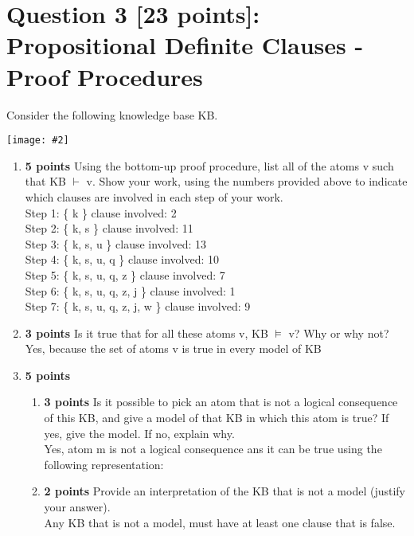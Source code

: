\documentclass{article}
\def\ans#1{{\color{ans}#1}}
\newcommand{\centerfig}[2]{\begin{center}\texttt{[image: \#2]}\end{center}}
\begin{document}
\clearpage
\section{Question 3 [23 points]: Propositional Definite Clauses - Proof Procedures}
Consider the following knowledge base KB.
\centerfig{0.2}{../figs/fig2}
\begin{enumerate}[label=(\alph*)]
    \item \textbf{5 points} Using the bottom-up proof procedure, list all of the atoms v such that KB $\vdash$ v. Show your work, using the numbers provided above to indicate which clauses are involved in each step of your work.\\
        \ans{
            Step 1:  \{ k \}  clause involved: 2 \\
            Step 2:  \{ k, s \}  clause involved: 11 \\
            Step 3:  \{ k, s, u \}  clause involved: 13 \\
            Step 4:  \{ k, s, u, q \}  clause involved: 10 \\
            Step 5:  \{ k, s, u, q, z \}  clause involved: 7 \\
            Step 6:  \{ k, s, u, q, z, j \}  clause involved: 1 \\
            Step 7:  \{ k, s, u, q, z, j, w \}  clause involved: 9 
        }
    \item \textbf{3 points} Is it true that for all these atoms v, KB $\vDash$ v? Why or why not?\\
        \ans{
          Yes, because the set of atoms v is true in every model of KB
        }
    \item \textbf{5 points}\\
    \begin{enumerate}[label=\roman*.]
        \item \textbf{3 points} Is it possible to pick an atom that is not a logical consequence of this KB, and give a model of that KB in which this atom is true? If yes, give the model. If no, explain why.\\
        \ans{
            Yes, atom m is not a logical consequence ans it can be true using the following representation:
        }
        \item \textbf{2 points} Provide an interpretation of the KB that is not a model (justify your answer).\\
        \ans{
            Any KB that is not a model, must have at least one clause that is false.
}
\end{enumerate}
\end{enumerate}
\end{document}
